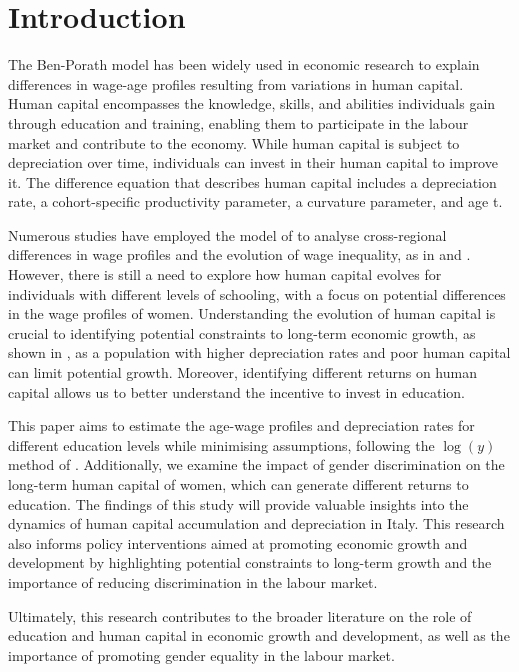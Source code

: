 \documentclass[12pt]{article}
\begin{document}
\section{Introduction}
The Ben-Porath model has been widely used in economic research to explain differences in wage-age profiles resulting
from variations in human capital. Human capital encompasses the knowledge, skills, and abilities individuals gain
through education and training, enabling them to participate in the labour market and contribute to the economy. While
human capital is subject to depreciation over time, individuals can invest in their human capital to improve it. The
difference equation that describes human capital includes a depreciation rate, a cohort-specific productivity parameter,
a curvature parameter, and age t.
\par
Numerous studies have employed the model of \citet{ben1967production} to analyse cross-regional differences in wage
profiles \citep{baker1997human} and the evolution of wage inequality, as in \citet{joshi2021gender} and
\citet{erosa2012human}.
However, there is still a need to explore how human capital evolves for individuals with different levels of
schooling, with a focus on potential differences in the wage profiles of women. Understanding the evolution of human
capital is crucial to identifying potential constraints to long-term economic growth, as shown in \citet{mincer1981human},
as a population with higher depreciation rates and poor human capital can limit potential growth. Moreover, identifying
different returns on human capital allows us to better understand the incentive to invest in education.
\par
This paper aims to estimate the age-wage profiles and depreciation rates for different education levels while minimising
assumptions, following the $\log(y)$ method of \citet{hendricks2013ben}. Additionally, we examine the impact of
gender discrimination on the long-term human capital of women, which can generate different returns to education. The
findings of this study will provide valuable insights into the dynamics of human capital accumulation and depreciation
in Italy. This research also informs policy interventions aimed at promoting economic growth and development by
highlighting potential constraints to long-term growth and the importance of reducing discrimination in the labour
market.
\par
Ultimately, this research contributes to the broader literature on the role of education and human capital in economic
growth and development, as well as the importance of promoting gender equality in the labour market.
\end{document}
